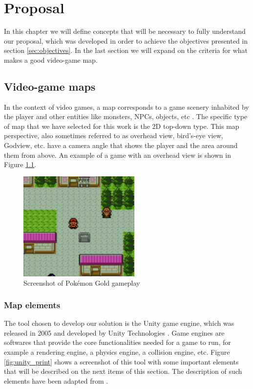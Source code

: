 \chapter{Proposal}
\label{chapter:proposal}

In this chapter we will define concepts that will be necessary to fully understand our proposal, which was developed in order to achieve the objectives presented in section \ref{sec:objectives}. In the last section we will expand on the criteria for what makes a good video-game map.

\section{Video-game maps}

In the context of video games, a map corresponds to a game scenery inhabited by the player and other entities like monsters, NPCs, objects, etc \cite{carvalho:2011}. The specific type of map that we have selected for this work is the 2D top-down type. This map perspective, also sometimes referred to as overhead view, bird's-eye view, Godview, etc. have a camera angle that shows the player and the area around them from above. An example of a game with an overhead view is shown in Figure \ref{fig:pokemon}.

\begin{figure}[h]
    \caption{Screenshot of Pokémon Gold gameplay}
    \centerline{\includegraphics[width=6cm]{images/proposal/pokemon.png}}
    \label{fig:pokemon}
\end{figure}

\subsection{Map elements}

The tool chosen to develop our solution is the Unity game engine, which was released in 2005 and developed by Unity Technologies \cite{unity:2021}. Game engines are softwares that provide the core functionalities needed for a game to run, for example a rendering engine, a physics engine, a collision engine, etc. Figure \ref{fig:unity_print} shows a screenshot of this tool with some important elements that will be described on the next items of this section. The description of such elements have been adapted from \textcite{carvalho:2011}.

